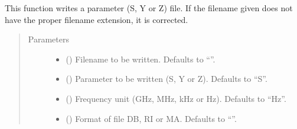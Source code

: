 \documentclass[letterpaper,10pt,english]{sphinxmanual}
\begin{document}
\begin{fulllineitems}
\begin{fulllineitems}
\label{\detokenize{touchstone:touchstone.spfile.write2file}}
This function writes a parameter (S, Y or Z) file. If the filename given does not have the proper filename extension, it is corrected.
\begin{quote}\begin{description}
\item[{Parameters}] \leavevmode\begin{itemize}
\item {} 
 (\sphinxstyleliteralemphasis{\sphinxupquote{, }}) \textendash{} Filename to be written. Defaults to “”.

\item {} 
 (\sphinxstyleliteralemphasis{\sphinxupquote{, }}) \textendash{} Parameter to be written (S, Y or Z). Defaults to “S”.

\item {} 
 (\sphinxstyleliteralemphasis{\sphinxupquote{, }}) \textendash{} Frequency unit (GHz, MHz, kHz or Hz). Defaults to “Hz”.

\item {} 
 (\sphinxstyleliteralemphasis{\sphinxupquote{, }}) \textendash{} Format of file DB, RI or MA. Defaults to “”.

\end{itemize}

\end{description}\end{quote}

\end{fulllineitems}


\end{fulllineitems}
\end{document}
